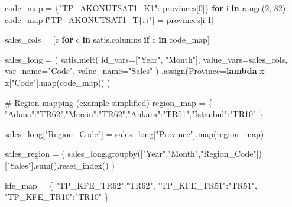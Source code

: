 \documentclass[
  11pt,
  a4paper,
]{article}
\newenvironment{Shaded}{\begin{snugshade}}{\end{snugshade}}
\newcommand{\BuiltInTok}[1]{\textcolor[rgb]{0.00,0.23,0.31}{#1}}
\newcommand{\CommentTok}[1]{\textcolor[rgb]{0.37,0.37,0.37}{#1}}
\newcommand{\ControlFlowTok}[1]{\textcolor[rgb]{0.00,0.23,0.31}{\textbf{#1}}}
\newcommand{\DecValTok}[1]{\textcolor[rgb]{0.68,0.00,0.00}{#1}}
\newcommand{\KeywordTok}[1]{\textcolor[rgb]{0.00,0.23,0.31}{\textbf{#1}}}
\newcommand{\NormalTok}[1]{\textcolor[rgb]{0.00,0.23,0.31}{#1}}
\newcommand{\OperatorTok}[1]{\textcolor[rgb]{0.37,0.37,0.37}{#1}}
\newcommand{\SpecialCharTok}[1]{\textcolor[rgb]{0.37,0.37,0.37}{#1}}
\newcommand{\SpecialStringTok}[1]{\textcolor[rgb]{0.13,0.47,0.30}{#1}}
\newcommand{\StringTok}[1]{\textcolor[rgb]{0.13,0.47,0.30}{#1}}
\begin{document}
\begin{Shaded}
\begin{Highlighting}[]
\NormalTok{code\_map }\OperatorTok{=}\NormalTok{ \{}\StringTok{"TP\_AKONUTSAT1\_K1"}\NormalTok{: provinces[}\DecValTok{0}\NormalTok{]\}}
\ControlFlowTok{for}\NormalTok{ i }\KeywordTok{in} \BuiltInTok{range}\NormalTok{(}\DecValTok{2}\NormalTok{, }\DecValTok{82}\NormalTok{):}
\NormalTok{    code\_map[}\SpecialStringTok{f"TP\_AKONUTSAT1\_T}\SpecialCharTok{\{}\NormalTok{i}\SpecialCharTok{\}}\SpecialStringTok{"}\NormalTok{] }\OperatorTok{=}\NormalTok{ provinces[i}\OperatorTok{{-}}\DecValTok{1}\NormalTok{]}

\NormalTok{sales\_cols }\OperatorTok{=}\NormalTok{ [c }\ControlFlowTok{for}\NormalTok{ c }\KeywordTok{in}\NormalTok{ satis.columns }\ControlFlowTok{if}\NormalTok{ c }\KeywordTok{in}\NormalTok{ code\_map]}

\NormalTok{sales\_long }\OperatorTok{=}\NormalTok{ (}
\NormalTok{    satis.melt(}
\NormalTok{        id\_vars}\OperatorTok{=}\NormalTok{[}\StringTok{"Year"}\NormalTok{, }\StringTok{"Month"}\NormalTok{],}
\NormalTok{        value\_vars}\OperatorTok{=}\NormalTok{sales\_cols,}
\NormalTok{        var\_name}\OperatorTok{=}\StringTok{"Code"}\NormalTok{,}
\NormalTok{        value\_name}\OperatorTok{=}\StringTok{"Sales"}
\NormalTok{    )}
\NormalTok{    .assign(Province}\OperatorTok{=}\KeywordTok{lambda}\NormalTok{ x: x[}\StringTok{"Code"}\NormalTok{].}\BuiltInTok{map}\NormalTok{(code\_map))}
\NormalTok{)}

\CommentTok{\# Region mapping (example simplified)}
\NormalTok{region\_map }\OperatorTok{=}\NormalTok{ \{}
    \StringTok{"Adana"}\NormalTok{:}\StringTok{"TR62"}\NormalTok{,}\StringTok{"Mersin"}\NormalTok{:}\StringTok{"TR62"}\NormalTok{,}\StringTok{"Ankara"}\NormalTok{:}\StringTok{"TR51"}\NormalTok{,}\StringTok{"İstanbul"}\NormalTok{:}\StringTok{"TR10"}
\NormalTok{\}}

\NormalTok{sales\_long[}\StringTok{"Region\_Code"}\NormalTok{] }\OperatorTok{=}\NormalTok{ sales\_long[}\StringTok{"Province"}\NormalTok{].}\BuiltInTok{map}\NormalTok{(region\_map)}

\NormalTok{sales\_region }\OperatorTok{=}\NormalTok{ (}
\NormalTok{    sales\_long.groupby([}\StringTok{"Year"}\NormalTok{,}\StringTok{"Month"}\NormalTok{,}\StringTok{"Region\_Code"}\NormalTok{])[}\StringTok{"Sales"}\NormalTok{].}\BuiltInTok{sum}\NormalTok{().reset\_index()}
\NormalTok{)}

\NormalTok{kfe\_map }\OperatorTok{=}\NormalTok{ \{}
    \StringTok{"TP\_KFE\_TR62"}\NormalTok{:}\StringTok{"TR62"}\NormalTok{,}
    \StringTok{"TP\_KFE\_TR51"}\NormalTok{:}\StringTok{"TR51"}\NormalTok{,}
    \StringTok{"TP\_KFE\_TR10"}\NormalTok{:}\StringTok{"TR10"}
\NormalTok{\}}


\end{Highlighting}
\end{Shaded}
\end{document}
